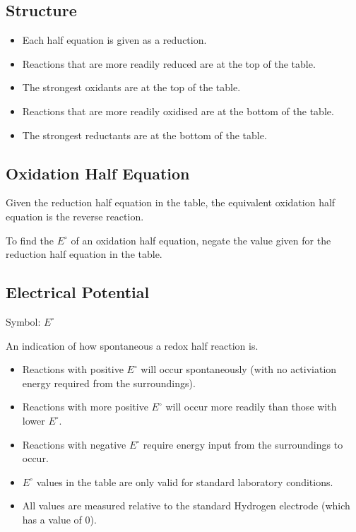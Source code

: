 \documentclass[a4paper,11pt]{article}
\begin{document}
\subsection{Structure}

\begin{itemize}
\item Each half equation is given as a reduction.
\item Reactions that are more readily reduced are at the top of the table.
\item The strongest oxidants are at the top of the table.
\item Reactions that are more readily oxidised are at the bottom of the table.
\item The strongest reductants are at the bottom of the table.
\end{itemize}

\subsection{Oxidation Half Equation}

Given the reduction half equation in the table, the equivalent oxidation half
equation is the reverse reaction.

To find the $E^\circ$ of an oxidation half equation, negate the value given for
the reduction half equation in the table.

\subsection{Electrical Potential}

Symbol: $E^\circ$

An indication of how spontaneous a redox half reaction is.

\begin{itemize}
\item Reactions with positive $E^\circ$ will occur spontaneously (with no
	activiation energy required from the surroundings).
\item Reactions with more positive $E^\circ$ will occur more readily than those
	with lower $E^\circ$.
\item Reactions with negative $E^\circ$ require energy input from the
	surroundings to occur.
\item $E^\circ$ values in the table are only valid for standard laboratory
	conditions.
\item All values are measured relative to the standard Hydrogen electrode (which
	has a value of 0).
\end{itemize}
\end{document}
